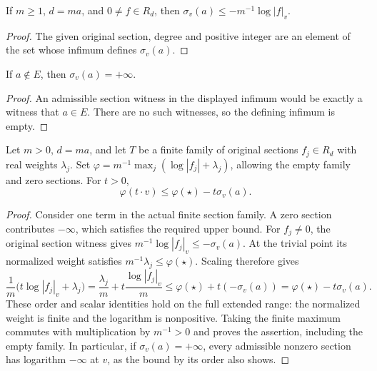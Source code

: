 \begin{lemma}
\label{lem:fp-section-order-witness}
\leanok
{}
If $m\ge1$, $d=ma$, and $0\ne f\in R_d$, then
$\sigma_v(a)\le-m^{-1}\log|f|_v$.
\end{lemma}
\begin{proof}
The given original section, degree and positive integer are an element
of the set whose infimum defines $\sigma_v(a)$.
\end{proof}

\begin{lemma}
\label{lem:fp-section-order-noneffective}
\leanok
{}
If $a\notin E$, then $\sigma_v(a)=+\infty$.
\end{lemma}
\begin{proof}
An admissible section witness in the displayed infimum would be exactly
a witness that $a\in E$.  There are no such witnesses, so the defining
infimum is empty.
\end{proof}

\begin{lemma}
\label{lem:fp-fs-data-ray}
\leanok
{}
Let $m>0$, $d=ma$, and let $T$ be a finite family of original sections
$f_j\in R_d$ with real weights $\lambda_j$.  Set
$\varphi=m^{-1}\max_j(\log|f_j|+\lambda_j)$, allowing the empty
family and zero sections.  For $t>0$,
\[
 \varphi(t\cdot v)\le\varphi(\star)-t\sigma_v(a).
\]
\end{lemma}
\begin{proof}
Consider one term in the actual finite section family.  A zero section
contributes $-\infty$, which satisfies the required upper bound.  For
$f_j\ne0$, the original section witness gives
$m^{-1}\log|f_j|_v\le-\sigma_v(a)$.  At the trivial point its
normalized weight satisfies
$m^{-1}\lambda_j\le\varphi(\star)$.  Scaling therefore gives
\[
 \frac1m\bigl(t\log|f_j|_v+\lambda_j\bigr)
 =\frac{\lambda_j}{m}+t\frac{\log|f_j|_v}{m}
 \le\varphi(\star)+t(-\sigma_v(a))
 =\varphi(\star)-t\sigma_v(a).
\]
These order and scalar identities hold on the full extended range:
the normalized weight is finite and the logarithm is nonpositive.
Taking the finite maximum commutes with multiplication by $m^{-1}>0$
and proves the assertion, including the empty family.  In particular,
if $\sigma_v(a)=+\infty$, every admissible nonzero section has
logarithm $-\infty$ at $v$, as the bound by its order also shows.
\end{proof}

